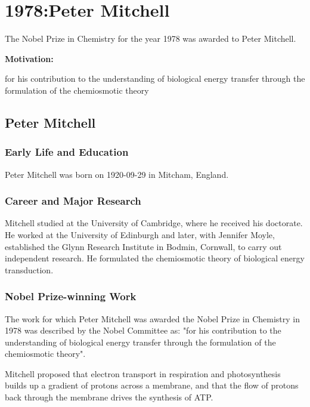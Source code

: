 \chapter{1978:Peter Mitchell}

\label{chap:chemistry1978}

The Nobel Prize in Chemistry for the year 1978 was awarded to Peter Mitchell.

\textbf{Motivation:}

for his contribution to the understanding of biological energy transfer through the formulation of the chemiosmotic theory

\section{Peter Mitchell}

\subsection*{Early Life and Education}

Peter Mitchell was born on 1920-09-29 in Mitcham, England.

\subsection*{Career and Major Research}

Mitchell studied at the University of Cambridge, where he received his doctorate. He worked at the University of Edinburgh and later, with Jennifer Moyle, established the Glynn Research Institute in Bodmin, Cornwall, to carry out independent research. He formulated the chemiosmotic theory of biological energy transduction.

\subsection*{Nobel Prize-winning Work}

The work for which Peter Mitchell was awarded the Nobel Prize in Chemistry in 1978 was described by the Nobel Committee as: "for his contribution to the understanding of biological energy transfer through the formulation of the chemiosmotic theory".

Mitchell proposed that electron transport in respiration and photosynthesis builds up a gradient of protons across a membrane, and that the flow of protons back through the membrane drives the synthesis of ATP.

